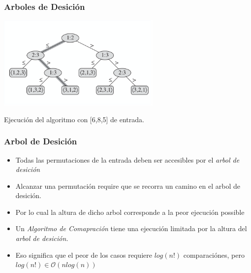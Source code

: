 \documentclass{beamer}
\begin{document}
\begin{frame}
    \frametitle{Arboles de Desici\'on}
    \begin{center}
        \includegraphics[width=8cm]{./cmpTree.png}
    \end{center}
    Ejecuci\'on del algoritmo con [6,8,5] de entrada.
\end{frame}

\begin{frame}
    \frametitle{Arbol de Desici\'on}
    \begin{itemize}
        \item{Todas las permutaciones de la entrada deben ser accesibles
        por el \emph{arbol de desici\'on}}
        \item{Alcanzar una permutaci\'on require que se recorra un camino
        en el arbol de desici\'on.}
        \item{Por lo cual la altura de dicho arbol corresponde a la peor
        ejecuci\'on possible}
        \item{Un \emph{Algoritmo de Comapraci\'on} tiene una ejecuci\'on limitada
        por la altura del \emph{arbol de desici\'on.}}
        \item{Eso significa que el peor de los casos requiere $log(n!)$ comparaci\'ones, pero
        $log(n!)\in \mathcal{O}(nlog(n))$}
    \end{itemize}
\end{frame}
\end{document}
